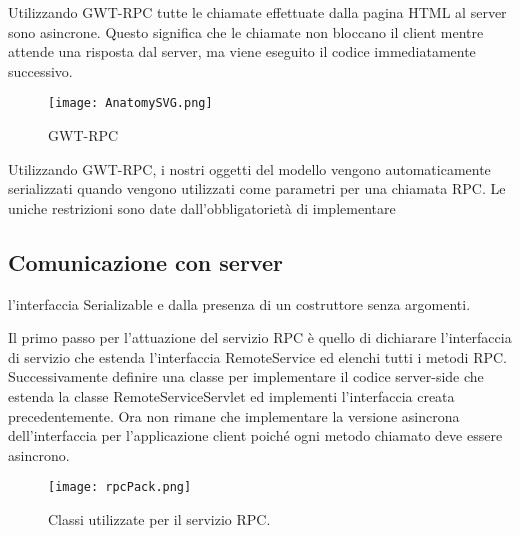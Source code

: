 
Utilizzando  GWT-RPC  tutte  le  chiamate  effettuate  dalla  pagina  HTML  al  server 
sono  asincrone.
Questo  significa  che  le  chiamate  non  bloccano  il  client  mentre attende   una 
risposta   dal   server,   ma   viene  eseguito   il   codice   immediatamente 
successivo.

\begin{figure}[!htb]
\centering%
\texttt{[image: AnatomySVG.png]}%
\caption{GWT-RPC }\label{fig:GWT-RPC}%
\end{figure}

\FloatBarrier
Utilizzando GWT-RPC, i nostri oggetti del modello vengono automaticamente serializzati quando vengono utilizzati come parametri per una chiamata RPC. Le uniche restrizioni sono date dall’obbligatorietà di implementare 
\subsection{Comunicazione con server}
l’interfaccia Serializable e dalla presenza di un costruttore senza argomenti. 

Il primo passo per l’attuazione del servizio RPC è quello di dichiarare l’interfaccia di servizio che estenda l’interfaccia RemoteService ed elenchi tutti i metodi RPC.
Successivamente definire una classe per implementare il codice server-side che estenda la classe RemoteServiceServlet ed implementi l’interfaccia creata precedentemente. 
Ora non rimane che implementare la versione asincrona dell'interfaccia per l’applicazione client poiché ogni metodo chiamato deve essere asincrono.

\begin{figure}[!htb]
\centering%
\texttt{[image: rpcPack.png]}%
\caption{Classi utilizzate per il servizio RPC. }\label{fig:RPCPack}%
\end{figure}